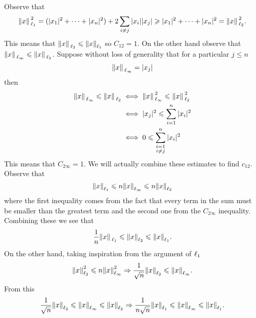 \documentclass[12pt]{memoir}
\begin{document}
\begin{ptcbr}
  Observe that 
  $$\norm*{x}_{\ell_1}^2=(|x_1|^2+\dots+|x_n|^2)+2\sum_{i\neq j}|x_i||x_j|\geqslant|x_1|^2+\dots+|x_n|^2=\norm*{x}_{\ell_2}^2.$$
  This means that $\norm*{x}_{\ell_2}\leqslant\norm{x}_{\ell_1}$ so $C_{12}=1$. On the other hand observe that $\norm*{x}_{\ell_\infty}\leqslant\norm*{x}_{\ell_2}$. Suppose without loss of generality that for a particular $j\leq n$
  $$\norm*{x}_{\ell_\infty}=|x_j|$$
  then
  \begin{align*}
    \norm*{x}_{\ell_\infty}\leqslant\norm*{x}_{\ell_2}&\iff \norm*{x}_{\ell_\infty}^2\leqslant\norm*{x}^2_{\ell_2}\\
    &\iff |x_j|^2\leqslant \sum_{i=1}^n |x_i|^2\\
    &\iff 0\leqslant \sum_{\substack{i=1\\i\neq j}}^n |x_i|^2
  \end{align*}
  This means that $C_{2\infty}=1$. We will actually combine these estimates to find $c_{12}$. Observe that 
  $$\norm{x}_{\ell_1}\leqslant n\norm{x}_{\ell_\infty}\leqslant n\norm{x}_{\ell_2}$$
  where the first inequality comes from the fact that every term in the sum must be smaller than the greatest term and the second one from the $C_{2\infty}$ inequality. Combining these we see that 
  $$\frac{1}{n}\norm*{x}_{\ell_1}\leqslant\norm{x}_{\ell_2}\leqslant\norm{x}_{\ell_1}.$$
  On the other hand, taking inspiration from the argument of $\ell_1$
  $$\norm{x}_{\ell_2}^2\leqslant n\norm{x}_{\ell_\infty}^2\Rightarrow \frac{1}{\sqrt{n}}\norm{x}_{\ell_2}\leqslant\norm{x}_{\ell_\infty}.$$
  From this 
  $$\frac{1}{\sqrt{n}}\norm{x}_{\ell_2}\leqslant\norm{x}_{\ell_\infty}\leqslant\norm{x}_{\ell_2}\Rightarrow \frac{1}{n\sqrt{n}}\norm{x}_{\ell_1}\leqslant \norm{x}_{\ell_\infty}\leqslant\norm{x}_{\ell_1}.$$
\end{ptcbr}
\end{document}
